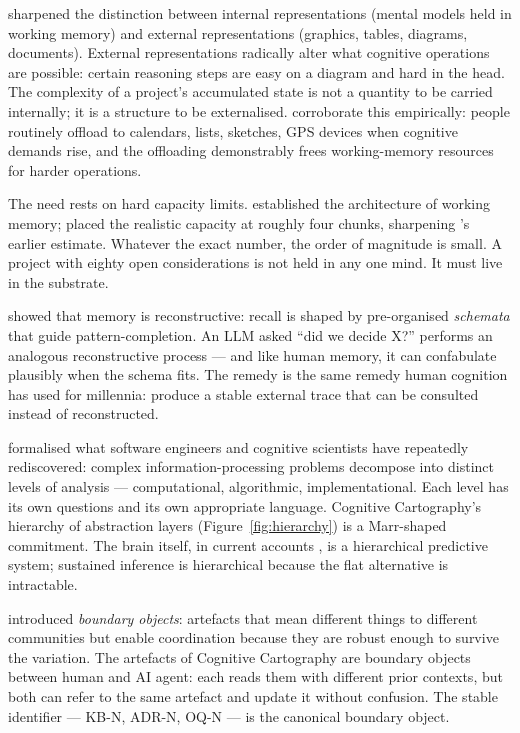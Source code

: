 \documentclass[11pt,a4paper,twocolumn]{article}
\begin{document}
\citet{scaife1996external} sharpened the distinction between
internal representations (mental models held in working memory) and
external representations (graphics, tables, diagrams, documents).
External representations radically alter what cognitive operations
are possible: certain reasoning steps are easy on a diagram and hard
in the head. The complexity of a project's accumulated state is
not a quantity to be carried internally; it is a structure to be
externalised. \citet{risko2016offloading} corroborate this
empirically: people routinely offload to calendars, lists, sketches,
GPS devices when cognitive demands rise, and the offloading
demonstrably frees working-memory resources for harder operations.

The need rests on hard capacity limits. \citet{baddeley1992wm}
established the architecture of working memory;
\citet{cowan2001magical} placed the realistic capacity at roughly
four chunks, sharpening \citet{miller1956magical}'s earlier
estimate. Whatever the exact number, the order of magnitude is
small. A project with eighty open considerations is not held in any
one mind. It must live in the substrate.

\citet{bartlett1932remembering} showed that memory is reconstructive:
recall is shaped by pre-organised \emph{schemata} that guide
pattern-completion. An LLM asked ``did we decide X?'' performs an
analogous reconstructive process --- and like human memory, it can
confabulate plausibly when the schema fits. The remedy is the same
remedy human cognition has used for millennia: produce a stable
external trace that can be consulted instead of reconstructed.

\citet{marr1982vision} formalised what software engineers and
cognitive scientists have repeatedly rediscovered: complex
information-processing problems decompose into distinct levels of
analysis --- computational, algorithmic, implementational. Each
level has its own questions and its own appropriate language.
Cognitive Cartography's hierarchy of abstraction layers
(Figure~\ref{fig:hierarchy}) is a Marr-shaped commitment. The brain
itself, in current accounts \citep{friston2010fep, clark2013whatever},
is a hierarchical predictive system; sustained inference is
hierarchical because the flat alternative is intractable.

\citet{star1989boundary} introduced \emph{boundary objects}:
artefacts that mean different things to different communities but
enable coordination because they are robust enough to survive the
variation. The artefacts of Cognitive Cartography are boundary
objects between human and AI agent: each reads them with different
prior contexts, but both can refer to the same artefact and update
it without confusion. The stable identifier --- KB-N, ADR-N, OQ-N
--- is the canonical boundary object.
\end{document}
